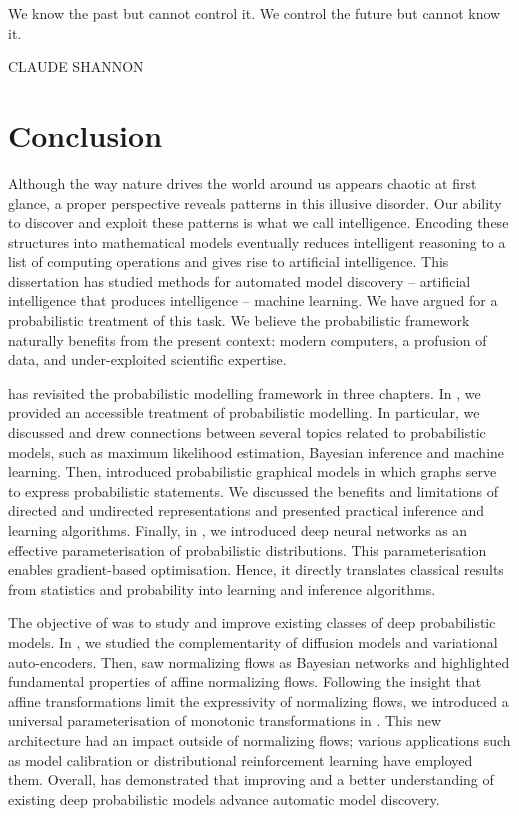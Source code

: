 \null\vfill
{\centering
\parbox{\textwidth}{%
  \raggedright
  {%

  We know the past but cannot control it. We control the future but cannot know it.\par\bigskip
  }
  \raggedleft\MakeUppercase{Claude Shannon}\par%
}}

\vfill\vfill


\chapter{Conclusion}\label{ch:08}
Although the way nature drives the world around us appears chaotic at first glance, a proper perspective reveals patterns in this illusive disorder. Our ability to discover and exploit these patterns is what we call intelligence. Encoding these structures into mathematical models eventually reduces intelligent reasoning to a list of computing operations and gives rise to artificial intelligence. This dissertation has studied methods for automated model discovery -- artificial intelligence that produces intelligence -- machine learning. We have argued for a probabilistic treatment of this task. We believe the probabilistic framework naturally benefits from the present context: modern computers, a profusion of data, and under-exploited scientific expertise.

 has revisited the probabilistic modelling framework in three chapters. In , we provided an accessible treatment of probabilistic modelling. In particular, we discussed and drew connections between several topics related to probabilistic models, such as maximum likelihood estimation, Bayesian inference and machine learning. Then,  introduced probabilistic graphical models in which graphs serve to express probabilistic statements. We discussed the benefits and limitations of directed and undirected representations and presented practical inference and learning algorithms. Finally, in , we introduced deep neural networks as an effective parameterisation of probabilistic distributions. This parameterisation enables gradient-based optimisation. Hence, it directly translates classical results from statistics and probability into learning and inference algorithms.

The objective of  was to study and improve existing classes of deep probabilistic models. In , we studied the complementarity of diffusion models and variational auto-encoders. Then,  saw normalizing flows as Bayesian networks and highlighted fundamental properties of affine normalizing flows. Following the insight that affine transformations limit the expressivity of normalizing flows, we introduced a universal parameterisation of monotonic transformations in . This new architecture had an impact outside of normalizing flows; various applications such as model calibration or distributional reinforcement learning have employed them. Overall,  has demonstrated that improving and a better understanding of existing deep probabilistic models advance automatic model discovery.

